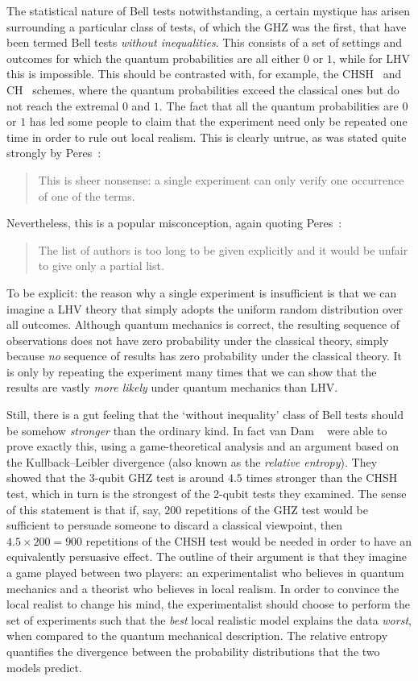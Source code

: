 The statistical nature of Bell tests notwithstanding, a certain mystique has arisen surrounding a particular class of tests, of which the GHZ was the first, that have been termed Bell tests \emph{without inequalities}. This consists of a set of settings and outcomes for which the quantum probabilities are all either $0$ or $1$, while for LHV this is impossible. This should be contrasted with,  for example, the CHSH~\cite{clauser_proposed_1969} and CH~\cite{clauser_experimental_1974} schemes, where the quantum probabilities exceed the classical ones but do not reach the extremal $0$ and $1$. The fact that all the quantum probabilities are $0$ or $1$ has led some people to claim that the experiment need only be repeated one time in order to rule out local realism. This is clearly untrue, as was stated quite strongly by Peres~\cite{peres_bayesian_2000}:
\begin{quote}
    This is sheer nonsense: a single experiment can only verify one occurrence of one of the terms\textellipsis.
\end{quote}
Nevertheless, this is a popular misconception, again quoting Peres~\cite{peres_bayesian_2000}:
\begin{quote}
    The list of authors is too long to be given explicitly and it would be unfair to give only a partial list.
\end{quote}
To be explicit: the reason why a single experiment is insufficient is that we can imagine a LHV theory that simply adopts the uniform random distribution over all outcomes. Although quantum mechanics is correct, the resulting sequence of observations does not have zero probability under the classical theory, simply because \emph{no} sequence of results has zero probability under the classical theory. It is only by repeating the experiment many times that we can show that the results are vastly \emph{more likely} under quantum mechanics than LHV\@.

Still, there is a gut feeling that the `without inequality' class of Bell tests should be somehow \emph{stronger} than the ordinary kind. In fact van Dam \etal~\cite{van_dam_statistical_2005} were able to prove exactly this, using a game-theoretical analysis and an argument based on the Kullback--Leibler divergence (also known as the \emph{relative entropy}). They showed that the 3-qubit GHZ test is around $4.5$ times stronger than the CHSH test, which in turn is the strongest of the 2-qubit tests they examined. The sense of this statement is that if, say, $200$ repetitions of the GHZ test would be sufficient to persuade someone to discard a classical viewpoint, then $4.5\times200=900$ repetitions of the CHSH test would be needed in order to have an equivalently persuasive effect. The outline of their argument is that they imagine a game played between two players: an experimentalist who believes in quantum mechanics and a theorist who believes in local realism. In order to convince the local realist to change his mind, the experimentalist should choose to perform the set of experiments such that the \emph{best} local realistic model explains the data \emph{worst}, when compared to the quantum mechanical description. The relative entropy quantifies the divergence between the probability distributions that the two models predict.

